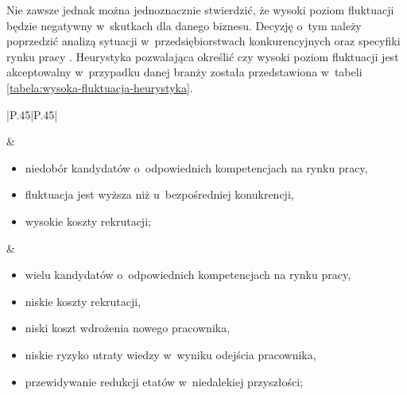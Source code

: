 Nie zawsze jednak można jednoznacznie stwierdzić, że wysoki poziom fluktuacji będzie negatywny w~skutkach dla danego biznesu.
Decyzję o~tym należy poprzedzić analizą sytuacji w~przedsiębiorstwach konkurencyjnych oraz specyfiki rynku pracy \cite{taylor-2006}.
Heurystyka pozwalająca określić czy wysoki poziom fluktuacji jest akceptowalny w~przypadku danej branży została przedstawiona w~tabeli \ref{tabela:wysoka-fluktuacja-heurystyka}.

\noindent\begin{minipage}{\textwidth}
             \begin{table}[H]
                 \raggedright\caption{Heurystyka do oceny wysokiego poziomu fluktuacji\label{tabela:wysoka-fluktuacja-heurystyka}}
                 \begin{center}
                     \begin{tabular}{|P{.45\textwidth}|P{.45\textwidth}|}

                         \hline
                          &
                          \\
                         \hline

                         \begin{itemize}
                             \item niedobór kandydatów o~odpowiednich kompetencjach na rynku pracy,
                             \item fluktuacja jest wyższa niż u~bezpośredniej konukrencji,
                             \item wysokie koszty rekrutacji;
                         \end{itemize} &
                         \begin{itemize}
                             \item wielu kandydatów o~odpowiednich kompetencjach na rynku pracy,
                             \item niskie koszty rekrutacji,
                             \item niski koszt wdrożenia nowego pracownika,
                             \item niskie ryzyko utraty wiedzy w~wyniku odejścia pracownika,
                             \item przewidywanie redukcji etatów w~niedalekiej przyszłości;
                         \end{itemize} \\
                         \hline
                     \end{tabular}
                 \end{center}
                 \raggedright{}
                 \vspace{0.75cm}
             \end{table}
\end{minipage}

